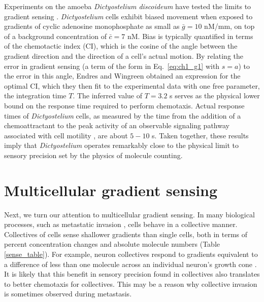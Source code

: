 Experiments on the amoeba \textit{Dictyostelium discoideum} have tested the limits to gradient sensing \cite{van2007biased}. \textit{Dictyostelium} cells exhibit biased movement when exposed to gradients of cyclic adenosine monophosphate as small as $\bar{g} = 10$ nM/mm, on top of a background concentration of $\bar{c} = 7$ nM. Bias is typically quantified in terms of the chemotactic index (CI), which is the cosine of the angle between the gradient direction and the direction of a cell's actual motion. By relating the error in gradient sensing (a term of the form in Eq.\ \ref{eq:ch1_g1} with $s = a$) to the error in this angle, Endres and Wingreen \cite{endres2008accuracy} obtained an expression for the optimal CI, which they then fit to the experimental data with one free parameter, the integration time $T$.
The inferred value of $T = 3.2$ s serves as the physical lower bound on the response time required to perform chemotaxis. Actual response times of \textit{Dictyostelium} cells, as measured by the time from the addition of a chemoattractant to the peak activity of an observable signaling pathway associated with cell motility \cite{postma2003uniform, parent2004making}, are about $5-10$ s. Taken together, these results imply that \textit{Dictyostelium} operates remarkably close to the physical limit to sensory precision set by the physics of molecule counting.


\section{Multicellular gradient sensing}

Next, we turn our attention to multicellular gradient sensing. In many biological processes, such as metastatic invasion \cite{cheung2013collective, friedl2012classifying}, cells behave in a collective manner. Collectives of cells sense shallower gradients than single cells, both in terms of percent concentration changes and absolute molecule numbers (Table \ref{sense_table}). For example, neuron collectives respond to gradients equivalent to a difference of less than one molecule across an individual neuron's growth cone \cite{rosoff2004new}. It is likely that this benefit in sensory precision found in collectives also translates to better chemotaxis for collectives. This may be a reason why collective invasion is sometimes observed during metastasis.

